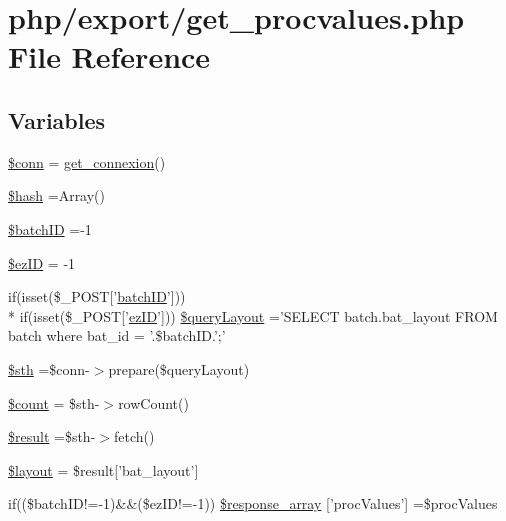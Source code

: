 \hypertarget{get__procvalues_8php}{\section{php/export/get\-\_\-procvalues.php File Reference}
\label{get__procvalues_8php}
}
\subsection*{Variables}
\begin{DoxyCompactItemize}
\item 
\hyperlink{get__procvalues_8php_aa8a5a87b9c1a6a0819b88447cbe41877}{\$conn} = \hyperlink{php__functions_8php_ace18bc10f3fd08f92688ac743e0d8c2e}{get\-\_\-connexion}()
\item 
\hyperlink{get__procvalues_8php_ac9fdf6f2c8fb45c1d3bb9a176802b2ad}{\$hash} =Array()
\item 
\hyperlink{get__procvalues_8php_aaa6d122ea9cb55b210aadd86e5654a74}{\$batch\-I\-D} =-\/1
\item 
\hyperlink{get__procvalues_8php_addb1ec3ba55e413a08cb006ce21974df}{\$ez\-I\-D} = -\/1
\item 
if(isset(\$\-\_\-\-P\-O\-S\-T\mbox{[}'\hyperlink{obsolete_2processing__bak_8php_a88c5bc4262b7c34f236357f5c53fc99b}{batch\-I\-D}'\mbox{]})) \\*
if(isset(\$\-\_\-\-P\-O\-S\-T\mbox{[}'\hyperlink{admin_rawdata_8php_adf465cadf95987152966d26567509f92}{ez\-I\-D}'\mbox{]})) \hyperlink{get__procvalues_8php_a4a2cac8789c689ec2ffe3ffcc33fa051}{\$query\-Layout} ='S\-E\-L\-E\-C\-T batch.\-bat\-\_\-layout F\-R\-O\-M batch where bat\-\_\-id = '.\$batch\-I\-D.';'
\item 
\hyperlink{get__procvalues_8php_afa9126f9664959c02795be300a135f93}{\$sth} =\$conn-\/$>$prepare(\$query\-Layout)
\item 
\hyperlink{get__procvalues_8php_af789423037bbc89dc7c850e761177570}{\$count} = \$sth-\/$>$row\-Count()
\item 
\hyperlink{get__procvalues_8php_a112ef069ddc0454086e3d1e6d8d55d07}{\$result} =\$sth-\/$>$fetch()
\item 
\hyperlink{get__procvalues_8php_a2b0d08e73a90b9443ce37506b7c6a544}{\$layout} = \$result\mbox{[}'bat\-\_\-layout'\mbox{]}
\item 
if((\$batch\-I\-D!=-\/1)\&\&(\$ez\-I\-D!=-\/1)) \hyperlink{get__procvalues_8php_ac730010bbce5fa8ff863cc0faea91cf7}{\$response\-\_\-array} \mbox{[}'proc\-Values'\mbox{]} =\$proc\-Values
\end{DoxyCompactItemize}


